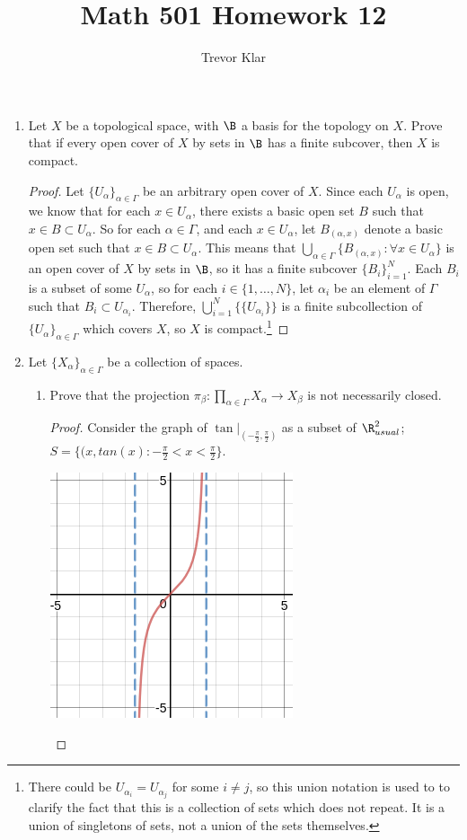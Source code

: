 \documentclass[letterpaper]{article}
\title{Math 501 \linebreak
Homework 12}
\author{Trevor Klar}
\newcommand{\arbcoll}[1]{\{#1_\alpha\}_{\alpha\in\Gamma}}
\newcommand{\arbprod}[1]{\prod\limits_{\alpha\in\Gamma}#1_\alpha}
\begin{document}
\maketitle

\begin{enumerate}
\item Let $X$ be a topological space, with $\B$ a basis for the topology on $X$. Prove that if every open cover of $X$ by sets in $\B$ has a finite subcover, then $X$ is compact. 
\begin{proof}
Let $\arbcoll{U}$ be an arbitrary open cover of $X$. Since each $U_\alpha$ is open, we know that for each $x\in U_\alpha$, there exists a basic open set $B$ such that $x\in B \subset U_\alpha$. So for each $\alpha\in\Gamma$, and each $x\in U_\alpha$, let $B_{(\alpha,x)}$ denote a basic open set such that $x\in B \subset U_\alpha$. This means that $\bigcup_{\alpha\in\Gamma}\{B_{(\alpha,x)} : \forall x\in U_\alpha \}$ is an open cover of $X$ by sets in $\B$, so it has a finite subcover $\{B_i\}_{i=1}^N$. Each $B_i$ is a subset of some $U_\alpha$, so for each $i\in\{1, \ldots, N\}$, let $\alpha_i$ be an element of $\Gamma$ such that $B_i\subset U_{\alpha_i}$. Therefore, $\bigcup_{i=1}^N \{\{U_{\alpha_i}\}\}$ is a finite subcollection of $\arbcoll{U}$ which covers $X$, so $X$ is compact.\footnote{There could be $U_{\alpha_i}=U_{\alpha_j}$ for some $i\neq j$, so this union notation is used to to clarify the fact that this is a collection of sets which does not repeat. It is a union of singletons of sets, not a union of the sets themselves.} 
\end{proof}

\item Let $\arbcoll{X}$ be a collection of spaces. 

	\begin{enumerate}
	\item Prove that the projection $\pi_\beta:\arbprod{X}\to X_\beta$ is not necessarily closed. 
	\begin{proof}
	Consider the graph of $\tan|_{(-\frac{\pi}{2},\frac{\pi}{2})}$ as a subset of $\R^2_{usual}$; $S=\{(x,tan(x) : -\frac{\pi}{2}<x<\frac{\pi}{2}\}$. 
	
	\begin{center}
	\includegraphics[scale=.3]{hw12_prob2a}
	\end{center}
	

\end{proof}
\end{enumerate}
\end{enumerate}
\end{document}
